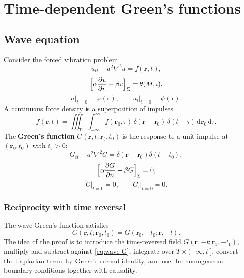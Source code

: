 \section{Time-dependent Green's functions}

\subsection{Wave equation}

Consider the forced vibration problem
\begin{equation}
\label{eq:wave-forced}
u_{tt}-a^2\nabla^2 u=f(\mathbf{r},t),
\end{equation}
\begin{equation}
\Bigl[\alpha\frac{\partial u}{\partial n}+\beta u\Bigr]_{\Sigma}=\theta(M,t),
\end{equation}
\begin{equation}
u\big|_{t=0}=\varphi(\mathbf{r}),
\qquad
u_t\big|_{t=0}=\psi(\mathbf{r}).
\end{equation}
A continuous force density is a superposition of impulses,
\begin{equation}
f(\mathbf{r},t)
=\iiint_{T}\int_{-\infty}^{\infty}
f(\mathbf{r}_0,\tau)\,
\delta(\mathbf{r}-\mathbf{r}_0)\,\delta(t-\tau)\,
\mathrm{d}\mathbf{r}_0\,\mathrm{d}\tau.
\end{equation}
The \textbf{Green's function} $G(\mathbf{r},t;\mathbf{r}_0,t_0)$ is the response to a unit impulse at $(\mathbf{r}_0,t_0)$ with $t_0>0$:
\begin{equation}
\label{eq:wave-G}
G_{tt}-a^2\nabla^2 G=\delta(\mathbf{r}-\mathbf{r}_0)\delta(t-t_0),
\end{equation}
\begin{equation}
\Bigl[\alpha\frac{\partial G}{\partial n}+\beta G\Bigr]_{\Sigma}=0,
\end{equation}
\begin{equation}
G\big|_{t=0}=0,
\qquad
G_t\big|_{t=0}=0.
\end{equation}

\subsubsection{Reciprocity with time reversal}

The wave Green's function satisfies
\begin{equation}
\label{eq:wave-recip}
G(\mathbf{r},t;\mathbf{r}_0,t_0)=G(\mathbf{r}_0,-t_0;\mathbf{r},-t).
\end{equation}
The idea of the proof is to introduce the time-reversed field $G(\mathbf{r},-t;\mathbf{r}_1,-t_1)$, multiply and subtract against \eqref{eq:wave-G}, integrate over $T\times(-\infty,t']$, convert the Laplacian terms by Green's second identity, and use the homogeneous boundary conditions together with causality.

